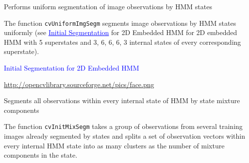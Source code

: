 

Performs uniform segmentation of image observations by HMM states


\begin{description}
\end{description}

The function \texttt{cvUniformImgSegm} segments image observations by HMM states uniformly (see \textcolor{blue}{\underline{Initial Segmentation}} for 2D Embedded HMM for 2D embedded HMM with 5 superstates and 3, 6, 6, 6, 3 internal states of every corresponding superstate).

\textcolor{blue}{Initial Segmentation for 2D Embedded HMM}

\url{http://opencvlibrary.sourceforge.net/pics/face.png}


Segments all observations within every internal state of HMM by state mixture components


\begin{description}
\end{description}

The function \texttt{cvInitMixSegm} takes a group of observations from several training images already segmented by states and splits a set of observation vectors within every internal HMM state into as many clusters as the number of mixture components in the state.


